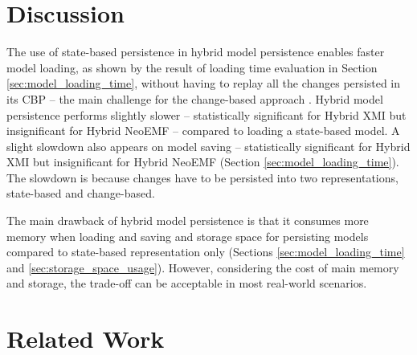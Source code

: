 \documentclass{llncs}
\begin{document}
\vspace{-20pt}
\section{Discussion}
\label{sec:discussion}

\vspace{-10pt}
The use of state-based persistence in hybrid model persistence enables faster model loading, as shown by the result of loading time evaluation in Section \ref{sec:model_loading_time}, without having to replay all the changes persisted in its CBP -- the main challenge for the change-based approach \cite{yohannis2018towards,mens2002state}. 
Hybrid model persistence performs slightly slower -- statistically significant for Hybrid XMI but insignificant for Hybrid NeoEMF -- compared to loading a state-based model. A slight slowdown also appears on model saving -- statistically significant for Hybrid XMI but insignificant for Hybrid NeoEMF (Section \ref{sec:model_loading_time}). The slowdown is because changes have to be persisted into two representations, state-based and change-based. 

The main drawback of hybrid model persistence is that it consumes more memory when loading and saving and storage space for persisting models compared to state-based representation only (Sections \ref{sec:model_loading_time} and \ref{sec:storage_space_usage}). However, considering the cost of main memory and storage, the trade-off can be acceptable in most real-world scenarios.

\vspace{-10pt}
\section{Related Work}
\label{sec:related_work}
\end{document}
